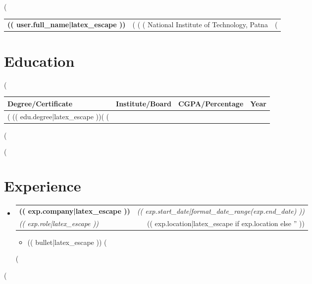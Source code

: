 \documentclass[a4paper,11pt]{article}
\makeatletter
\newcommand{\resumeSubheading}[4]{
\vspace{0.5mm}\item
    \begin{tabular*}{0.98\textwidth}[t]{l@{\extracolsep{\fill}}r}
        \textbf{#1} & \textit{\footnotesize{#4}} \\
        \textit{\footnotesize{#3}} &  \footnotesize{#2}\\
    \end{tabular*}
    \vspace{-2.4mm}
}
\newcommand{\resumeSubHeadingListStart}{\begin{itemize}[leftmargin=*,labelsep=1mm]}
\newcommand{\resumeItemListStart}{\begin{itemize}[leftmargin=*,labelsep=1mm,itemsep=0.5mm]}
\newcommand{\resumeSubHeadingListEnd}{\end{itemize}\vspace{2mm}}
\newcommand{\resumeItemListEnd}{\end{itemize}\vspace{-2mm}}
\makeatother
\begin{document}
\selectfont

\parbox{2.35cm}{%
(%
}
\parbox{\dimexpr\linewidth-2.8cm\relax}{
\begin{tabularx}{\linewidth}{L r}
  \textbf{\LARGE (( user.full_name|latex_escape ))} & (%
  (%
  (%
  National Institute of Technology, Patna
  & (%
\end{tabularx}
}
\vspace{-2mm}

\section{\textbf{Education}}
\vspace{1mm}
\setlength{\tabcolsep}{5pt}
(%
\begin{tabularx}{\textwidth}{|>{\centering\arraybackslash}X|>{\centering\arraybackslash}p{8cm}|>{\centering\arraybackslash}p{3cm}|>{\centering\arraybackslash}p{2.5cm}|}
  \hline
  \textbf{Degree/Certificate} & \textbf{Institute/Board} & \textbf{CGPA/Percentage} & \textbf{Year} \\
  \hline
  (%
  (( edu.degree|latex_escape ))(%
  \hline
  (%
\end{tabularx}
(%
\vspace{-4mm}

(%
\section{\textbf{Experience}}
\vspace{-0.4mm}
\resumeSubHeadingListStart
(%
\resumeSubheading
    {(( exp.company|latex_escape ))}{(( exp.location|latex_escape if exp.location else '' ))}
    {(( exp.role|latex_escape ))}{(( exp.start_date|format_date_range(exp.end_date) ))}
    \resumeItemListStart
      (%
      \item (( bullet|latex_escape ))
      (%
    \resumeItemListEnd
(%
\resumeSubHeadingListEnd
\vspace{-6mm}
(%
\end{document}
